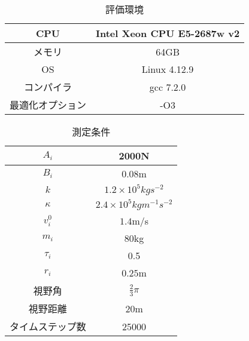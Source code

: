 \begin{table}[tb]
  \begin{center}
    \caption{評価環境}
    \label{tb:com_env}
    \begin{tabular}{c|c}
      \hline \hline
      CPU              & Intel Xeon CPU E5-2687w v2 \\ \hline
      メモリ           & 64GB                       \\ \hline
      OS               & Linux 4.12.9               \\ \hline
      コンパイラ       & gcc 7.2.0                  \\ \hline
      最適化オプション & -O3                        \\ \hline
    \end{tabular}
  \end{center}
\end{table}
\fi

\begin{table}[tb]
  \begin{center}
    \caption{測定条件}
    \label{tb:tab_para}
    \begin{tabular}{c|c}
      \hline \hline
      $A_i$            & 2000N                              \\ \hline 
      $B_i$            & 0.08m                              \\ \hline 
      $k$              & $1.2 \times 10^5 kg s^{-2} $       \\ \hline 
      $\kappa$         & $2.4 \times 10^5 kg m^{-1} s^{-2}$ \\ \hline 
      $v_i^0$          & $1.4$m/s                           \\ \hline 
      $m_i$            & $80$kg                             \\ \hline 
      $\tau_i$         & 0.5                               \\ \hline 
      $r_i$            & $0.25$m                            \\ \hline 
		視野角         & $\frac{2}{3}\pi$                   \\ \hline 
      視野距離         & $20$m                              \\ \hline 
      タイムステップ数 & 25000                              \\ \hline
    \end{tabular}
  \end{center}
\end{table}

